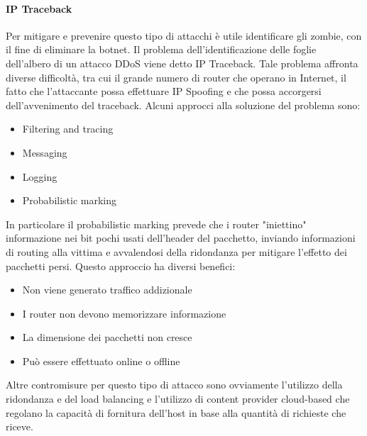 \paragraph{IP Traceback}
Per mitigare e prevenire questo tipo di attacchi è utile identificare gli zombie, con il fine di eliminare la botnet. Il problema dell'identificazione delle foglie dell'albero di un attacco DDoS viene detto IP Traceback. Tale problema affronta diverse difficoltà, tra cui il grande numero di router che operano in Internet, il fatto che l'attaccante possa effettuare IP Spoofing e che possa accorgersi dell'avvenimento del traceback.
\newline \newline
Alcuni approcci alla soluzione del problema sono:
\begin{itemize}
\item Filtering and tracing 
\item Messaging 
\item Logging
\item Probabilistic marking
\end{itemize}
In particolare il probabilistic marking prevede che i router "iniettino" informazione nei bit pochi usati dell'header del pacchetto, inviando informazioni di routing alla vittima e avvalendosi della ridondanza per mitigare l'effetto dei pacchetti persi. Questo approccio ha diversi benefici:
\begin{itemize}
\item Non viene generato traffico addizionale
\item I router non devono memorizzare informazione
\item La dimensione dei pacchetti non cresce
\item Può essere effettuato online o offline
\end{itemize}
Altre contromisure per questo tipo di attacco sono ovviamente l'utilizzo della ridondanza e del load balancing e l'utilizzo di content provider cloud-based che regolano la capacità di fornitura dell'host in base alla quantità di richieste che riceve.

